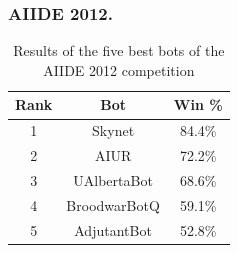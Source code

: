 \documentclass{llncs}
\begin{document}

\subsubsection{AIIDE 2012.}

\begin{table}[!t]
\caption{Results of the five best bots of the AIIDE 2012 competition}
\label{tab:aiide2012}
\centering
\begin{tabular}{|c|c|c|}
\hline
{\bfseries Rank} & {\bfseries Bot} & {\bfseries Win \%} \\
\hline
1 & Skynet & 84.4\% \\
2 & AIUR & 72.2\% \\
3 & UAlbertaBot & 68.6\% \\
4 & BroodwarBotQ & 59.1\% \\
5 & AdjutantBot & 52.8\% \\
\hline
\end{tabular}
\end{table}
\end{document}
